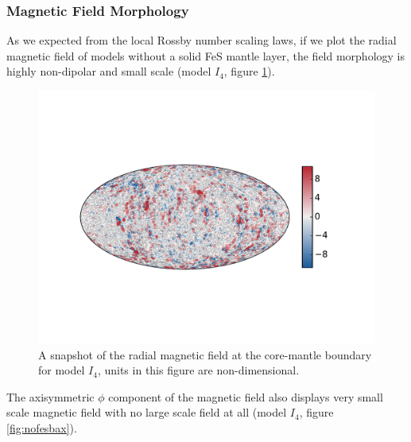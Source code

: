 \subsubsection{Magnetic Field Morphology}
As we expected from the local Rossby number scaling laws, if we plot the radial magnetic field of models without a solid FeS mantle layer, the field morphology is highly non-dipolar and small scale (model $I_4$, figure \ref{fig:nofesbr}).
\begin{figure}
	\centering
        \includegraphics[width=.8\textwidth]{Chapter5/Figures/br10_004_1800_100.pdf} 
        \caption{A snapshot of the radial magnetic field at the core-mantle boundary for model $I_{4}$, units in this figure are non-dimensional.}
        \label{fig:nofesbr}
\end{figure}
The axisymmetric $\phi$ component of the magnetic field also displays very small scale magnetic field with no large scale field at all (model $I_{4}$, figure \ref{fig:nofesbax}). 
